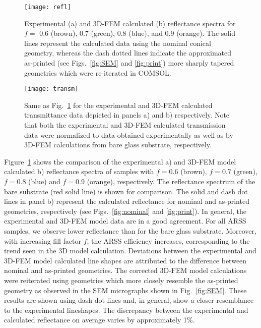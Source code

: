 \documentclass[9pt,twocolumn,twoside]{osajnl}
\begin{document}
\begin{figure}[hbt]
	\centering
	\texttt{[image: refl]}
	\caption{Experimental (a) and 3D-FEM calculated (b) reflectance spectra for $f=$ 0.6 (brown), 0.7 (green), 0.8 (blue), and 0.9 (orange). The solid lines represent the calculated data using the nominal conical geometry, whereas the dash dotted lines indicate the approximated as-printed (see Figs.~\ref{fig:SEM} and \ref{fig:print}) more sharply tapered geometries which were re-iterated in COMSOL.}
	\label{fig:refl}
\end{figure} 

 
\begin{figure}[hbt]
	\centering
	\texttt{[image: transm]}
	\caption{Same as Fig.~\ref{fig:refl} for the experimental and 3D-FEM calculated transmittance data depicted in panels a) and b) respectively. Note that both the experimental and 3D-FEM calculated transmission data were normalized to data obtained experimentally as well as by 3D-FEM calculations from bare glass substrate, respectively.}
	\label{fig:transm}
\end{figure} 

Figure~\ref{fig:refl} shows the comparison of the experimental a) and 3D-FEM model calculated b) reflectance spectra of samples with $f=0.6$ (brown), $f=0.7$ (green), $f=0.8$ (blue) and $f=0.9$ (orange), respectively. The reflectance spectrum of the bare substrate (red solid line) is shown for comparison. The solid and dash dot lines in panel b) represent the calculated reflectance for nominal and as-printed geometries, respectively (see Figs.~\ref{fig:nominal} and \ref{fig:print}). In general, the experimental and 3D-FEM model data are in a good agreement. For all ARSS samples, we observe lower reflectance than for the bare glass substrate. Moreover, with increasing fill factor $f$, the ARSS efficiency increases, corresponding to the trend seen in the 3D model calculation. 
%
Deviations between the experimental and 3D-FEM model calculated line shapes are attributed to the difference between nominal and as-printed geometries. The corrected 3D-FEM model calculations were reiterated using geometries which more closely resemble the as-printed geometry as observed in the SEM micrographs shown in Fig.~\ref{fig:SEM}. These results are shown using dash dot lines and, in general, show a closer resemblance to the experimental lineshapes. The discrepancy between the experimental and calculated reflectance on average varies by approximately 1\%. 
\end{document}
